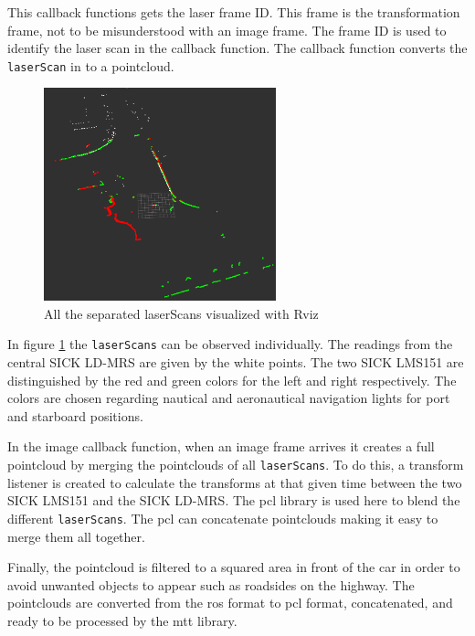 This callback functions gets the laser frame ID. This frame is the transformation frame, not to be misunderstood with an image frame. The frame ID is used to identify the laser scan in the callback function. The callback function converts the \texttt{laserScan} in to a pointcloud.

\begin{figure}[htp]
	
	\centering
	\includegraphics[width=0.6\textwidth]{caplabel/imgs/rviz0.png}
	
	\caption{All the separated laserScans visualized with Rviz}
	\label{fig:rviz0}
	
\end{figure}

In figure \ref{fig:rviz0} the \texttt{laserScans} can be observed individually. The readings from the central SICK LD-MRS are given by the white points. The two SICK LMS151 are distinguished by the red and green colors for the left and right respectively. The colors are chosen regarding nautical and aeronautical navigation lights for port and starboard positions.

In the image callback function, when an image frame arrives it creates a full pointcloud by merging the pointclouds of all \texttt{laserScans}. To do this, a transform listener is created to calculate the transforms at that given time between the two SICK LMS151 and the SICK LD-MRS. The \gls{pcl} library is used here to blend the different \texttt{laserScans}. The \gls{pcl} can concatenate pointclouds making it easy to merge them all together.

Finally, the pointcloud is filtered to a squared area in front of the car in order to avoid unwanted objects to appear such as roadsides on the highway. The pointclouds are converted from the \gls{ros} format to \gls{pcl} format, concatenated, and ready to be processed by the \gls{mtt} library. 

